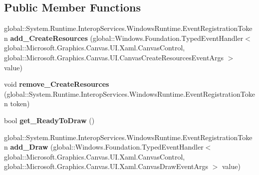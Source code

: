 \subsection*{Public Member Functions}
\begin{DoxyCompactItemize}
\item 
\mbox{\label{class_microsoft_1_1_graphics_1_1_canvas_1_1_u_i_1_1_xaml_1_1_canvas_control_ab026eb60db1a9fa4336dcb1ac14e4fb4}} 
global\+::\+System.\+Runtime.\+Interop\+Services.\+Windows\+Runtime.\+Event\+Registration\+Token {\bfseries add\+\_\+\+Create\+Resources} (global\+::\+Windows.\+Foundation.\+Typed\+Event\+Handler$<$ global\+::\+Microsoft.\+Graphics.\+Canvas.\+U\+I.\+Xaml.\+Canvas\+Control, global\+::\+Microsoft.\+Graphics.\+Canvas.\+U\+I.\+Canvas\+Create\+Resources\+Event\+Args $>$ value)
\item 
\mbox{\label{class_microsoft_1_1_graphics_1_1_canvas_1_1_u_i_1_1_xaml_1_1_canvas_control_aee51056da35ed3fa259233ef54dda668}} 
void {\bfseries remove\+\_\+\+Create\+Resources} (global\+::\+System.\+Runtime.\+Interop\+Services.\+Windows\+Runtime.\+Event\+Registration\+Token token)
\item 
\mbox{\label{class_microsoft_1_1_graphics_1_1_canvas_1_1_u_i_1_1_xaml_1_1_canvas_control_a8c352fee2e45098d724d65a687a38126}} 
bool {\bfseries get\+\_\+\+Ready\+To\+Draw} ()
\item 
\mbox{\label{class_microsoft_1_1_graphics_1_1_canvas_1_1_u_i_1_1_xaml_1_1_canvas_control_a733ea4b79b9f0c15e8be4a4701c50a33}} 
global\+::\+System.\+Runtime.\+Interop\+Services.\+Windows\+Runtime.\+Event\+Registration\+Token {\bfseries add\+\_\+\+Draw} (global\+::\+Windows.\+Foundation.\+Typed\+Event\+Handler$<$ global\+::\+Microsoft.\+Graphics.\+Canvas.\+U\+I.\+Xaml.\+Canvas\+Control, global\+::\+Microsoft.\+Graphics.\+Canvas.\+U\+I.\+Xaml.\+Canvas\+Draw\+Event\+Args $>$ value)
\item 
\mbox{\label{class_microsoft_1_1_graphics_1_1_canvas_1_1_u_i_1_1_xaml_1_1_canvas_control_ad2a843f823ae97fdab81ae2b2e2564fa}} 

\end{DoxyCompactItemize}
